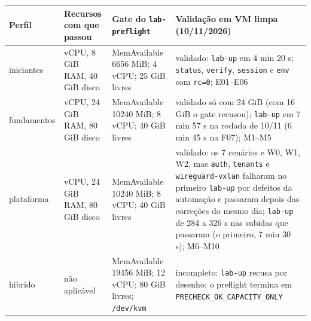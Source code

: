 \documentclass[12pt,openany,oneside,a4paper,chapter=TITLE,english,brazil]{abntex2}
\begin{document}
\begin{quadro}[!htbp]
\caption{Requisitos de admissão e validação em VM limpa, por perfil}
\footnotesize
\begin{tabularx}{\textwidth}{|>{\raggedright\arraybackslash\hsize=0.434\hsize}X|>{\raggedright\arraybackslash\hsize=0.740\hsize}X|>{\raggedright\arraybackslash\hsize=0.907\hsize}X|>{\raggedright\arraybackslash\hsize=1.919\hsize}X|}
\hline
\textbf{Perfil} & \textbf{Recursos com que passou} & \textbf{Gate do \texttt{lab-{}\allowbreak{}preflight}} & \textbf{Validação em VM limpa (10/11/2026)} \\
\hline
iniciantes & 4 vCPU, 8 GiB RAM, 40 GiB disco & MemAvailable 6656 MiB; 4 vCPU; 25 GiB livres & validado: \texttt{lab-{}\allowbreak{}up} em 4 min 20 s; \texttt{status},
\texttt{verify}, \texttt{session} e \texttt{env} com
\texttt{rc=\allowbreak{}0}; E01--E06 \\
\hline
fundamentos & 8 vCPU, 24 GiB RAM, 80 GiB disco & MemAvailable 10240 MiB; 8 vCPU; 40 GiB livres & validado só com 24 GiB (com 16 GiB o gate recusou);
\texttt{lab-{}\allowbreak{}up} em 7 min 57 s na rodada de 10/11 (6 min
45 s na F07); M1--M5 \\
\hline
plataforma & 8 vCPU, 24 GiB RAM, 80 GiB disco & MemAvailable 10240 MiB; 8 vCPU; 40 GiB livres & validado: os 7 cenários e W0, W1, W2, mas \texttt{auth},
\texttt{tenants} e \texttt{wireguard-{}\allowbreak{}vxlan} falharam no
primeiro \texttt{lab-{}\allowbreak{}up} por defeitos da automação e
passaram depois das correções do mesmo dia;
\texttt{lab-{}\allowbreak{}up} de 284 a 326 s nas subidas que passaram
(o primeiro, 7 min 30 s); M6--M10 \\
\hline
hibrido & não aplicável & MemAvailable 19456 MiB; 12 vCPU; 80 GiB livres;
\texttt{/\allowbreak{}dev/\allowbreak{}kvm} & incompleto: \texttt{lab-{}\allowbreak{}up} recusa por desenho; o
preflight termina em
\texttt{PRECHECK\_\allowbreak{}OK\_\allowbreak{}CAPACITY\_\allowbreak{}ONLY} \\
\hline
\end{tabularx}
\end{quadro}
\end{document}
